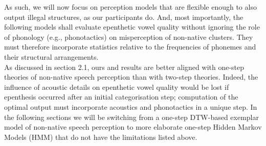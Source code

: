 As such, we will now focus on perception models that are flexible enough to also output illegal structures, as our participants do. And, most importantly, the following models shall evaluate epenthetic vowel quality without ignoring the role of phonology (e.g., phonotactics) on misperception of non-native clusters. They must therefore incorporate statistics relative to the frequencies of phonemes and their structural {\color{red}arrangements}. \\

As discussed in {\color{red} section 2.1}, ours and \cite{dupoux2011} results are better aligned with one-step theories of non-native speech perception than with two-step theories. Indeed, the influence of acoustic details on epenthetic vowel quality would be lost if epenthesis occurred after an initial categorisation step; computation of the optimal output must incorporate acoustics and phonotactics in a unique step. In the following sections we will be switching from a one-step DTW-based exemplar model of non-native speech perception to more elaborate one-step Hidden Markov Models (HMM) that do not have the limitations listed above.

